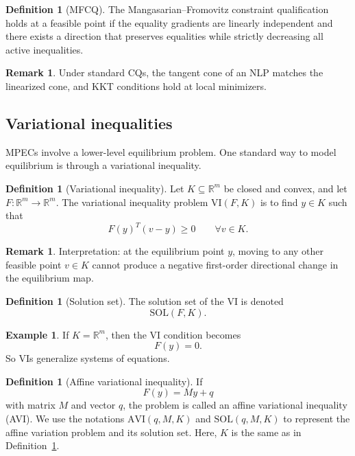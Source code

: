 \documentclass[pdflatex,sn-mathphys-num]{sn-jnl}%
\theoremstyle{definition}
\newtheorem{definition}[theorem]{Definition}
\newtheorem{remark}[theorem]{Remark}
\newtheorem{example}[theorem]{Example}
\begin{document}
\begin{definition}[MFCQ]
The Mangasarian--Fromovitz constraint qualification holds at a feasible
point if the equality gradients are linearly independent and there exists a
direction that preserves equalities while strictly decreasing all active
inequalities.
\end{definition}

\begin{remark}
Under standard CQs, the tangent cone of an NLP matches the linearized
cone, and KKT conditions hold at local minimizers.
\end{remark}

\subsection{Variational inequalities}

MPECs involve a lower-level equilibrium problem. One standard way to
model equilibrium is through a variational inequality.

\begin{definition}[Variational inequality]\label{def:variation_ineq}
Let $K\subseteq\mathbb{R}^m$ be closed and convex, and let
$F:\mathbb{R}^m\to\mathbb{R}^m$. The variational inequality problem
$\mathrm{VI}(F,K)$ is to find $y\in K$ such that
\[
F(y)^T(v-y)\ge 0
\qquad \forall v\in K.
\]
\end{definition}

\begin{remark}
Interpretation: at the equilibrium point $y$, moving to any other feasible
point $v\in K$ cannot produce a negative first-order directional change in
the equilibrium map.
\end{remark}

\begin{definition}[Solution set]
The solution set of the VI is denoted
\[
\mathrm{SOL}(F,K).
\]
\end{definition}

\begin{example}
If $K=\mathbb{R}^m$, then the VI condition becomes
\[
F(y)=0.
\]
So VIs generalize systems of equations.
\end{example}

\begin{definition}[Affine variational inequality]
If
\[
F(y)=My+q
\]
with matrix $M$ and vector $q$, the problem is called an affine
variational inequality (AVI). We use the notations $\mathrm{AVI}(q,M,K)$ and $\mathrm{SOL}(q,M,K)$ to represent the affine variation problem and its solution set. Here, $K$ is the same as in Definition~\ref{def:variation_ineq}.
\end{definition}
\end{document}
